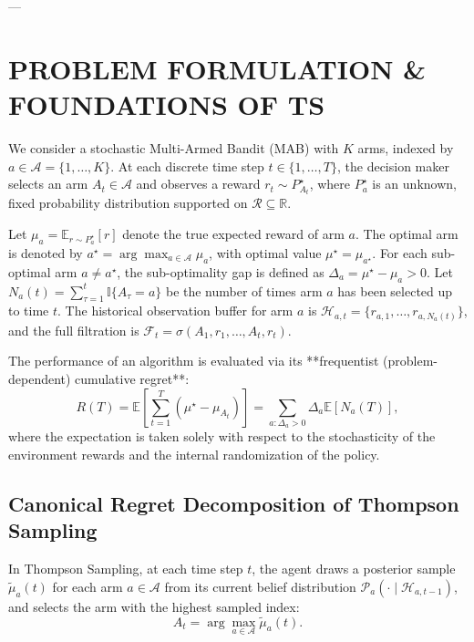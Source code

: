 \documentclass[twoside]{article}
\begin{document}
---

\section{PROBLEM FORMULATION \& FOUNDATIONS OF TS}
\label{sec:formulation}

We consider a stochastic Multi-Armed Bandit (MAB) with $K$ arms, indexed by $a \in \mathcal{A} = \{1, \dots, K\}$. At each discrete time step $t \in \{1, \dots, T\}$, the decision maker selects an arm $A_t \in \mathcal{A}$ and observes a reward $r_t \sim P^\star_{A_t}$, where $P^\star_a$ is an unknown, fixed probability distribution supported on $\mathcal{R} \subseteq \mathbb{R}$.

Let $\mu_a = \mathbb{E}_{r \sim P^\star_a}[r]$ denote the true expected reward of arm $a$. The optimal arm is denoted by $a^\star = \arg\max_{a \in \mathcal{A}} \mu_a$, with optimal value $\mu^\star = \mu_{a^\star}$. For each sub-optimal arm $a \ne a^\star$, the sub-optimality gap is defined as $\Delta_a = \mu^\star - \mu_a > 0$. Let $N_a(t) = \sum_{\tau=1}^t \mathbb{I}\{A_\tau = a\}$ be the number of times arm $a$ has been selected up to time $t$. The historical observation buffer for arm $a$ is $\mathcal{H}_{a, t} = \{r_{a, 1}, \dots, r_{a, N_a(t)}\}$, and the full filtration is $\mathcal{F}_t = \sigma(A_1, r_1, \dots, A_t, r_t)$.

The performance of an algorithm is evaluated via its **frequentist (problem-dependent) cumulative regret**:
\begin{equation}
R(T) = \mathbb{E}\left[ \sum_{t=1}^T (\mu^\star - \mu_{A_t}) \right] = \sum_{a: \Delta_a > 0} \Delta_a \mathbb{E}[N_a(T)],
\label{eq:frequentist_regret}
\end{equation}
where the expectation is taken solely with respect to the stochasticity of the environment rewards and the internal randomization of the policy.

\subsection{Canonical Regret Decomposition of Thompson Sampling}

In Thompson Sampling, at each time step $t$, the agent draws a posterior sample $\tilde{\mu}_a(t)$ for each arm $a \in \mathcal{A}$ from its current belief distribution $\mathcal{P}_a(\cdot \mid \mathcal{H}_{a, t-1})$, and selects the arm with the highest sampled index:
\begin{equation}
A_t = \arg\max_{a \in \mathcal{A}} \tilde{\mu}_a(t).
\label{eq:ts_rule}
\end{equation}
\end{document}
